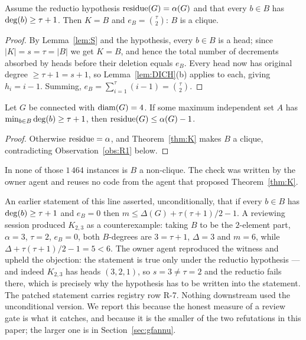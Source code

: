 \begin{theorem}[the $K = B$ corner is a clique]\label{thm:K}
Assume the reductio hypothesis $\operatorname{residue}(G) = \alpha(G)$ and that every $b \in B$ has
$\mathrm{deg}(b) \ge \tau+1$. Then $K = B$ and $e_B = \binom{\tau}{2}$: $B$ is a clique.
\end{theorem}

\begin{proof}
By Lemma~\ref{lem:S} and the hypothesis, every $b \in B$ is a head; since
$|K| = s = \tau = |B|$ we get $K = B$, and hence the total number of decrements absorbed by
heads before their deletion equals $e_B$. Every head now has original degree
$\ge \tau+1 = s+1$, so Lemma~\ref{lem:DICH}(b) applies to each, giving $h_i = i-1$.
Summing, $e_B = \sum_{i=1}^{\tau}(i-1) = \binom{\tau}{2}$.
\end{proof}

\begin{corollary}\label{cor:K1}
Let $G$ be connected with $\operatorname{diam}(G) = 4$. If some maximum independent set $A$ has
$\min_{b \in B} \mathrm{deg}(b) \ge \tau+1$, then $\operatorname{residue}(G) \le \alpha(G) - 1$.
\end{corollary}

\begin{proof}
Otherwise $\operatorname{residue} = \alpha$, and Theorem~\ref{thm:K} makes $B$ a clique, contradicting
Observation~\ref{obs:R1} below.
\end{proof}

\begin{remark}\label{rem:thmK}
In none of those $1\,464$ instances is $B$ a non-clique. The check was written by the owner
agent and reuses no code from the agent that proposed Theorem~\ref{thm:K}.
\end{remark}

\begin{remark}
\label{sec:upstream-selfref}
An earlier statement of this line asserted, unconditionally, that if every $b \in B$ has
$\mathrm{deg}(b) \ge \tau+1$ and $e_B = 0$ then $m \le \Delta(G) + \tau(\tau+1)/2 - 1$. A reviewing
session produced $K_{2,3}$ as a counterexample: taking $B$ to be the $2$-element part,
$\alpha = 3$, $\tau = 2$, $e_B = 0$, both $B$-degrees are $3 = \tau+1$, $\Delta = 3$ and
$m = 6$, while $\Delta + \tau(\tau+1)/2 - 1 = 5 < 6$. The owner agent reproduced the
witness and upheld the objection: the statement is true only under the reductio hypothesis
--- and indeed $K_{2,3}$ has heads $(3,2,1)$, so $s = 3 \ne \tau = 2$ and the reductio fails
there, which is precisely why the hypothesis has to be written into the statement. The
patched statement carries registry row R-7. Nothing downstream used the unconditional
version. We report this because the honest measure of a review gate is what it catches, and
because it is the smaller of the two refutations in this paper; the larger one is in
Section~\ref{sec:gfannu}.
\end{remark}


